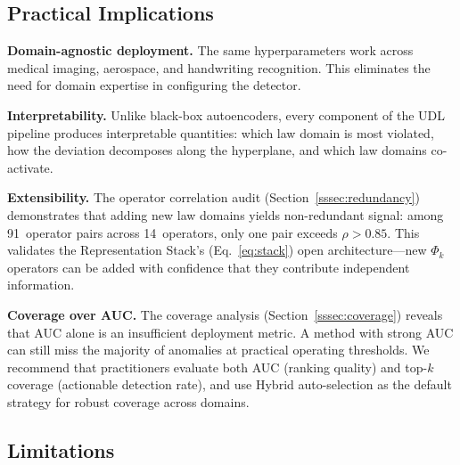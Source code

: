 \documentclass[journal]{IEEEtran}
\begin{document}
\subsection{Practical Implications}

\textbf{Domain-agnostic deployment.} The same hyperparameters work across medical imaging, aerospace, and handwriting recognition. This eliminates the need for domain expertise in configuring the detector.

\textbf{Interpretability.} Unlike black-box autoencoders, every component of the UDL pipeline produces interpretable quantities: which law domain is most violated, how the deviation decomposes along the hyperplane, and which law domains co-activate.

\textbf{Extensibility.} The operator correlation audit (Section~\ref{sssec:redundancy}) demonstrates that adding new law domains yields non-redundant signal: among 91~operator pairs across 14~operators, only one pair exceeds $\rho > 0.85$. This validates the Representation Stack's (Eq.~\eqref{eq:stack}) open architecture---new $\Phi_k$ operators can be added with confidence that they contribute independent information.

\textbf{Coverage over AUC.} The coverage analysis (Section~\ref{sssec:coverage}) reveals that AUC alone is an insufficient deployment metric. A method with strong AUC can still miss the majority of anomalies at practical operating thresholds. We recommend that practitioners evaluate both AUC (ranking quality) and top-$k$ coverage (actionable detection rate), and use Hybrid auto-selection as the default strategy for robust coverage across domains.

\subsection{Limitations}
\label{sec:limitations}
\end{document}
